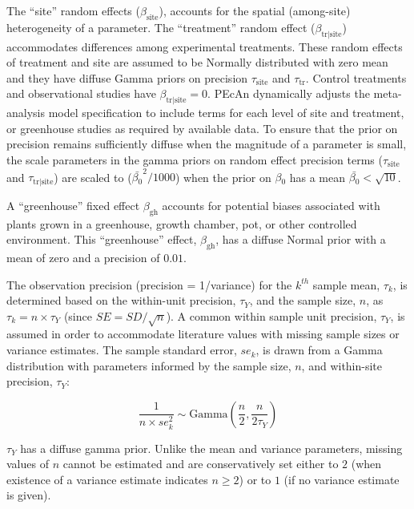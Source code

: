 \documentclass[12pt]{article}
\begin{document}
\begin{flushleft}
\begin{spacing}{1.9}
 The ``site'' random effects ($\beta_{\text{site}}$), accounts for the spatial (among-site) heterogeneity of a parameter.
 The ``treatment'' random effect ($\beta_{\text{tr|site}}$) accommodates differences among experimental treatments. 
 These random effects of treatment and site are assumed to be Normally distributed with zero mean and they have diffuse Gamma priors on precision  $\tau_{\text{site}}$ and $\tau_{\text{tr}}$.
 Control treatments and observational studies have $\beta_{\text{tr|site}}=0$.
 PEcAn dynamically adjusts the meta-analysis model specification to include terms for each level of site and treatment, or greenhouse studies as required by available data.
 To ensure that the prior on precision remains sufficiently diffuse when the magnitude of a parameter is small, the scale parameters in the gamma priors on random effect precision terms ($\tau_{\text{site}}$ and $\tau_{\text{tr|site}}$) are scaled to ($\bar{\beta{_0}}^2/1000$) when the prior on $\beta{_0}$ has a mean $\bar{\beta{_0}}<\sqrt{10}$. 

 A ``greenhouse'' fixed effect $\beta_{\text{gh}}$ accounts for potential biases associated with plants grown in a  greenhouse, growth chamber, pot, or other controlled environment.
 This ``greenhouse'' effect,  $\beta_{\text{gh}}$,  has a diffuse Normal prior with a mean of zero and a precision of $0.01$.

 The observation precision (precision = 1/variance) for the $k^{th}$ sample mean, $\tau_{k}$, is determined based on the within-unit precision, $\tau_{Y}$, and the sample size, $n$, as $\tau_{k}=n\times\tau_{Y}$ (since $SE = SD/\sqrt{n}$).
 A common within sample unit precision, $\tau_{Y}$, is assumed in order to accommodate literature values with missing sample sizes or variance estimates. 
 The sample standard error, $se_{k}$, is drawn from a Gamma distribution with parameters informed by the sample size, $n$, and within-site precision, $\tau_Y$: 

\begin{equation}\label{eq:semodel}
\frac{1}{n\times se_k^2}\sim\text{Gamma}(\frac{n}{2}, \frac{n}{2\tau_{Y}})
\end{equation}

 $\tau_{Y}$ has a diffuse gamma prior.
 Unlike the mean and variance parameters, missing values of $n$ cannot be estimated and are conservatively set either  to $2$ (when existence of a variance estimate indicates $n\ge 2$) or to $1$ (if no variance estimate is given).


\end{spacing}
\end{flushleft}
\end{document}
